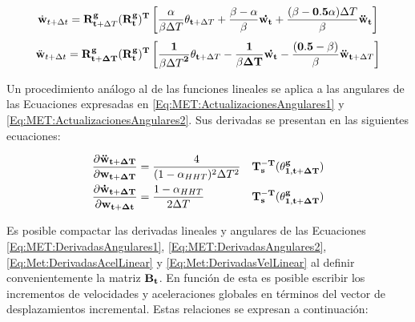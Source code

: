 \begin{equation}
\label{Eq:MET:ActualizacionesAngulares1}
\begin{aligned}
	\dot{\bf{w}}_{t+\Delta t} ={} & \bf{R}^g_{t+ \text{$\Delta T$}}(\bf{R}^g_{t})^T\left[\frac{\alpha}{\beta\text{$\Delta T$}}\bf{\theta}_{t+\text{$\Delta T$}}+
	\frac{\beta-\alpha}{\beta}\bf{\dot{w_t}+\frac{(\beta-0.5\alpha)\text{$\Delta T$}}{\beta}}	\ddot{\bf{w}}_{t} \right ] \\
\end{aligned}
\end{equation}
\vspace{-.5cm}
\begin{equation}
\label{Eq:MET:ActualizacionesAngulares2}
\begin{aligned}
	\ddot{\bf{w}}_{t+\Delta t}={} &\bf{R}^g_{t+\Delta T}(\bf{R}^g_{t})^T\left[\frac{1}{\beta\text{$\Delta T$}^2}\bf{\theta}_{t+\text{$\Delta T$}}-	\frac{1}{\beta \Delta T}\bf{\dot{w_t}-\frac{(0.5-\beta)}{\beta}}	\ddot{\bf{w}}_{t+\text{$\Delta T$}} \right ] \\
\end{aligned}
\end{equation}

Un procedimiento análogo al de las funciones lineales se aplica a las angulares de las Ecuaciones expresadas en \eqref{Eq:MET:ActualizacionesAngulares1} y \eqref{Eq:MET:ActualizacionesAngulares2}. Sus derivadas se presentan en las siguientes ecuaciones:

\begin{eqnarray}
\label{Eq:MET:DerivadasAngulares1}
\frac{\partial \bf{\ddot{w}_{t+\Delta T}}}{\partial \bf{{w}_{t+\Delta T}}}& = 
\frac{4}{(1-\alpha_{HHT})^2 \Delta T^2}&  \bf{T_s^{-T}}(\bf{\theta^g_{1,{t+\Delta T}}})\\
\label{Eq:MET:DerivadasAngulares2}
\frac{\partial \bf{\dot{w}_{t+\Delta T}}}{\partial \bf{{w}_{t+\Delta t}}}& = 
\frac{1-\alpha_{HHT}}{2\Delta T}& \bf{T_s^{-T}}(\bf{\theta^g_{1,{t+\Delta T}}})
\end{eqnarray}

Es posible compactar las derivadas lineales y angulares de las Ecuaciones \eqref{Eq:MET:DerivadasAngulares1}, \eqref{Eq:MET:DerivadasAngulares2}, \eqref{Eq:Met:DerivadasAcelLinear} y \eqref{Eq:Met:DerivadasVelLinear} al definir convenientemente la matriz $\bf{B_t}$. En función de esta es posible escribir los incrementos de velocidades y aceleraciones globales en términos del vector de desplazamientos incremental. Estas relaciones se expresan a continuación:

